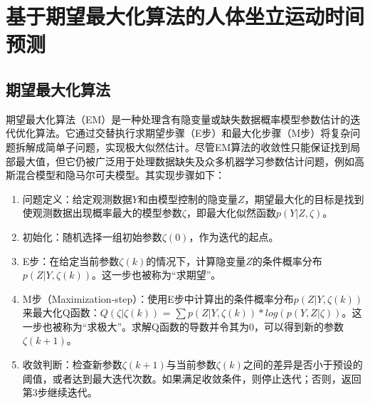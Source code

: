 \section{基于期望最大化算法的人体坐立运动时间预测}
\subsection{期望最大化算法}
期望最大化算法（EM）是一种处理含有隐变量或缺失数据概率模型参数估计的迭代优化算法。它通过交替执行求期望步骤（E步）和最大化步骤（M步）将复杂问题拆解成简单子问题，实现极大似然估计。尽管EM算法的收敛性只能保证找到局部最大值，但它仍被广泛用于处理数据缺失及众多机器学习参数估计问题，例如高斯混合模型和隐马尔可夫模型。其实现步骤如下：

\begin{enumerate}
\item 问题定义：给定观测数据$Y$和由模型控制的隐变量$Z$，期望最大化的目标是找到使观测数据出现概率最大的模型参数$\zeta $，即最大化似然函数$p(Y|Z, \zeta)$。

\item 初始化：随机选择一组初始参数$\zeta(0)$，作为迭代的起点。

\item E步：在给定当前参数$\zeta(k)$的情况下，计算隐变量$Z$的条件概率分布$p(Z|Y, \zeta(k))$。这一步也被称为“求期望”。

\item M步（Maximization-step）：使用E步中计算出的条件概率分布$p(Z|Y, \zeta(k))$来最大化Q函数：$Q(\zeta|\zeta(k))$ = $\sum p(Z|Y, \zeta(k)) * log(p(Y, Z|\zeta))$。这一步也被称为``求极大''。求解Q函数的导数并令其为0，可以得到新的参数$\zeta(k+1)$。

\item 收敛判断：检查新参数$\zeta(k+1)$与当前参数$\zeta(k)$之间的差异是否小于预设的阈值，或者达到最大迭代次数。如果满足收敛条件，则停止迭代；否则，返回第3步继续迭代。
\end{enumerate}

